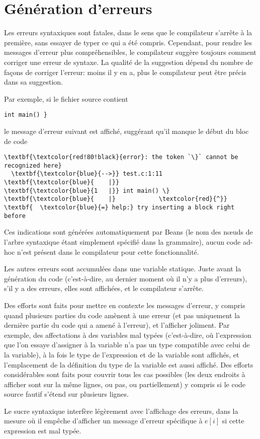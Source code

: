 \documentclass{scrartcl}
\begin{document}
\section*{Génération d'erreurs}
Les erreurs syntaxiques sont fatales, dans le sens que le compilateur s'arrête
à la première, sans essayer de typer ce qui a été compris. Cependant, pour rendre
les messages d'erreur plus compréhensibles, le compilateur suggère toujours
comment corriger une erreur de syntaxe. La qualité de la suggestion dépend du
nombre de façons de corriger l'erreur: moins il y en a, plus le compilateur peut
être précis dans sa suggestion.\par
Par exemple, si le fichier source contient
\begin{verbatim}
int main() }
\end{verbatim}
le message d'erreur suivant est affiché, suggérant qu'il manque le
début du bloc de code\pagebreak
\begin{tcolorbox}[breakable, colback=LightGray, spartan]%
  \begin{Verbatim}[commandchars=\\\{\}, formatcom=\color{white}]
  \textbf{\textcolor{red!80!black}{error}: the token `\}` cannot be recognized here}
  \textbf{\textcolor{blue}{-->}} test.c:1:11
\textbf{\textcolor{blue}{    |}}
\textbf{\textcolor{blue}{1   |}} int main() \}
\textbf{\textcolor{blue}{    |}            \textcolor{red}{^}}
\textbf{  \textcolor{blue}{=} help:} try inserting a block right before
\end{Verbatim}
\end{tcolorbox}
Ces indications sont générées automatiquement par Beans (le nom des
n\oe{}uds de l'arbre syntaxique étant simplement spécifié dans la grammaire),
aucun code ad-hoc n'est présent dans le compilateur pour cette
fonctionnalité.\par
Les autres erreurs sont accumulées dans une variable statique. Juste
avant la génération du code (c'est-à-dire, au dernier moment où il n'y
a plus d'erreurs), s'il y a des erreurs, elles sont affichées, et le
compilateur s'arrête.\par
Des efforts sont faits pour mettre en contexte les messages d'erreur, y compris
quand plusieurs parties du code amènent à une erreur (et pas uniquement la
dernière partie du code qui a amené à l'erreur), et l'afficher joliment.
Par exemple, des affectations à des variables mal typées (c'est-à-dire,
où l'expression que l'on essaye d'assigner à la variable n'a pas un
type compatible avec celui de la variable), à la fois le type de
l'expression et de la variable sont affichés, et l'emplacement de la
définition du type de la variable est aussi affiché. Des efforts
considérables sont faits pour couvrir tous les cas possibles (les deux
endroits à afficher sont sur la même lignes, ou pas, ou partiellement)
y compris si le code source fautif s'étend sur plusieurs lignes.\par
Le sucre syntaxique interfère légèrement avec l'affichage des erreurs, dans la
mesure où il empêche d'afficher un message d'erreur spécifique à \(e[i]\) si
cette expression est mal typée.
\end{document}
